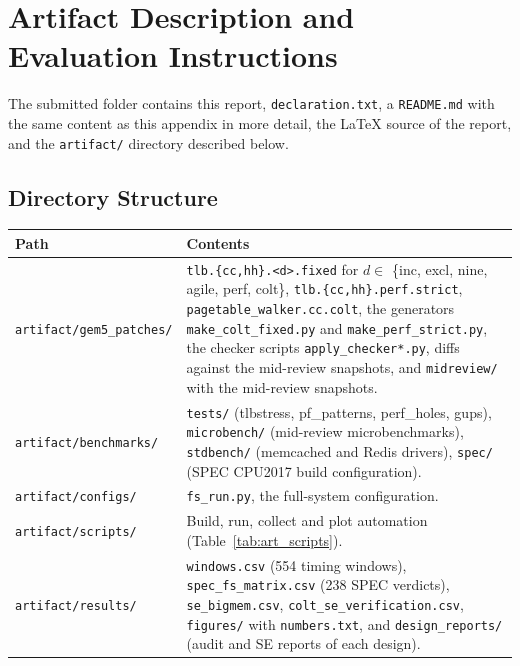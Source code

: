 \section{Artifact Description and Evaluation Instructions}
\label{app:artifact}

The submitted folder contains this report, \texttt{declaration.txt}, a \texttt{README.md} with the same content as this appendix in more detail, the LaTeX source of the report, and the \texttt{artifact/} directory described below.

\subsection{Directory Structure}
\begin{table}[H]
\centering
\small
\begin{tabularx}{\textwidth}{l X}
\toprule
\textbf{Path} & \textbf{Contents} \\
\midrule
\texttt{artifact/gem5\_patches/} & \texttt{tlb.\{cc,hh\}.<d>.fixed} for $d \in$ \{inc, excl, nine, agile, perf, colt\}, \texttt{tlb.\{cc,hh\}.perf.strict}, \texttt{pagetable\_walker.cc.colt}, the generators \texttt{make\_colt\_fixed.py} and \texttt{make\_perf\_strict.py}, the checker scripts \texttt{apply\_checker*.py}, diffs against the mid-review snapshots, and \texttt{midreview/} with the mid-review snapshots. \\
\texttt{artifact/benchmarks/} & \texttt{tests/} (tlbstress, pf\_patterns, perf\_holes, gups), \texttt{microbench/} (mid-review microbenchmarks), \texttt{stdbench/} (memcached and Redis drivers), \texttt{spec/} (SPEC CPU2017 build configuration). \\
\texttt{artifact/configs/} & \texttt{fs\_run.py}, the full-system configuration. \\
\texttt{artifact/scripts/} & Build, run, collect and plot automation (Table~\ref{tab:art_scripts}). \\
\texttt{artifact/results/} & \texttt{windows.csv} (554 timing windows), \texttt{spec\_fs\_matrix.csv} (238 SPEC verdicts), \texttt{se\_bigmem.csv}, \texttt{colt\_se\_verification.csv}, \texttt{figures/} with \texttt{numbers.txt}, and \texttt{design\_reports/} (audit and SE reports of each design). \\
\bottomrule
\end{tabularx}
\end{table}

